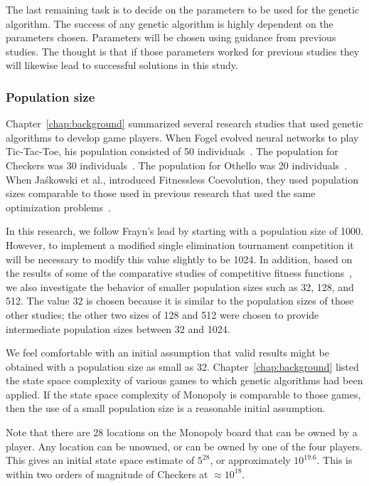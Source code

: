 The last remaining task is to decide on the parameters to be used for the
genetic algorithm. The success of any genetic algorithm is highly dependent on
the parameters chosen. Parameters will be chosen using guidance from previous
studies. The thought is that if those parameters worked for previous studies
they will likewise lead to successful solutions in this study.

\subsubsection{Population size}

Chapter~\ref{chap:background} summarized several research studies that used
genetic algorithms to develop game players. When Fogel evolved neural networks
to play Tic-Tac-Toe, his population consisted of 50
individuals~\cite{Fogel1993}. The population for Checkers was 30
individuals~\cite{Fogel2000Anaconda,journals/tec/ChellapillaF01}.
The population for Othello was 20 individuals~\cite{ChongTW05}. When
Ja\'{s}kowski et al., introduced Fitnessless Coevolution, they used population
sizes comparable to those used in previous research that used the same
optimization problems~\cite{Jaskowski:2008:FC:1389095.1389161}.

In this research, we follow Frayn's lead by starting with a population size of
1000. However, to implement a modified single elimination tournament competition
it will be necessary to modify this value slightly to be 1024. In addition,
based on the results of some of the comparative studies of competitive fitness
functions~\cite{Angeline:1993:CEE:645513.657590, Panait02acomparative,
Jaskowski:2008:FC:1389095.1389161}, we also investigate the behavior of smaller
population sizes such as 32, 128, and 512. The value 32 is chosen because it is
similar to the population sizes of those other studies; the other two sizes of
128 and 512 were chosen to provide intermediate population sizes between 32 and
1024.

We feel comfortable with an initial assumption that valid results might be
obtained with a population size as small as 32. Chapter~\ref{chap:background}
listed the state space complexity of various games to which genetic algorithms
had been applied. If the state space complexity of Monopoly is comparable to
those games, then the use of a small population size is a reasonable initial
assumption.

Note that there are 28 locations on the Monopoly board that can be owned by a
player. Any location can be unowned, or can be owned by one of the four players.
This gives an initial state space estimate of \(5^{28}\), or approximately
\(10^{19.6}\). This is within two orders of magnitude of Checkers at
\(\approx10^{18}\). 

